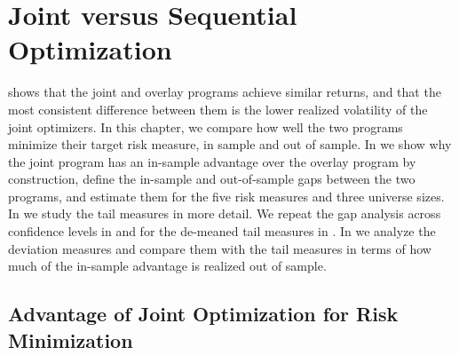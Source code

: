 \chapter{Joint versus Sequential Optimization}\label{chap:joint-vs-sequential}

 shows that the joint and overlay programs achieve similar returns, and that the most
consistent difference between them is the lower realized volatility of the joint optimizers. In this chapter, we
compare how well the two programs minimize their target risk measure, in sample and out of sample. In
 we show why the joint program has an in-sample advantage over the overlay program by
construction, define the in-sample and out-of-sample gaps between the two programs, and estimate them for the five risk
measures and three universe sizes. In  we study the tail measures in more detail. We repeat
the gap analysis across confidence levels in  and for the de-meaned tail measures in
. In  we analyze the deviation measures and compare
them with the tail measures in terms of how much of the in-sample advantage is realized out of sample.

\section{Advantage of Joint Optimization for Risk Minimization}\label{sec:joint-in-sample-case}

